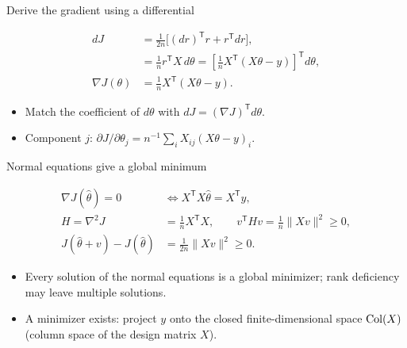 \begin{frame}{Derive the gradient using a differential}
\begin{definitionbox}
\[
\begin{aligned}
dJ&=\frac1{2n}\bigl[(dr)^{\mathsf T}r+r^{\mathsf T}dr\bigr],\\
&=\frac1n r^{\mathsf T}X\,d\theta
=\left[\frac1n X^{\mathsf T}(X\theta-y)\right]^{\mathsf T}d\theta,\\
\nabla J(\theta)&=\frac1n X^{\mathsf T}(X\theta-y).
\end{aligned}
\]
\end{definitionbox}
\small
\begin{itemize}\setlength{\itemsep}{7pt}
\item Match the coefficient of $d\theta$ with $dJ=(\nabla J)^{\mathsf T}d\theta$.
\item Component $j$: $\partial J/\partial\theta_j=n^{-1}\sum_i X_{ij}(X\theta-y)_i$.
\end{itemize}
\end{frame}

\begin{frame}{Normal equations give a global minimum}
\begin{definitionbox}
\[
\begin{aligned}
\nabla J(\widehat\theta)=0
&\iff X^{\mathsf T}X\widehat\theta=X^{\mathsf T}y,\\
H=\nabla^2J&=\frac1nX^{\mathsf T}X,\qquad
v^{\mathsf T}Hv=\frac1n\lVert Xv\rVert^2\ge0,\\
J(\widehat\theta+v)-J(\widehat\theta)
&=\frac1{2n}\lVert Xv\rVert^2\ge0.
\end{aligned}
\]
\end{definitionbox}
\small
\begin{itemize}\setlength{\itemsep}{8pt}
\item Every solution of the normal equations is a global minimizer; rank deficiency may leave multiple solutions.
\item A minimizer exists: project $y$ onto the closed finite-dimensional space $\operatorname{Col}(X)$ (column space of the design matrix $X$).
\end{itemize}
\end{frame}

